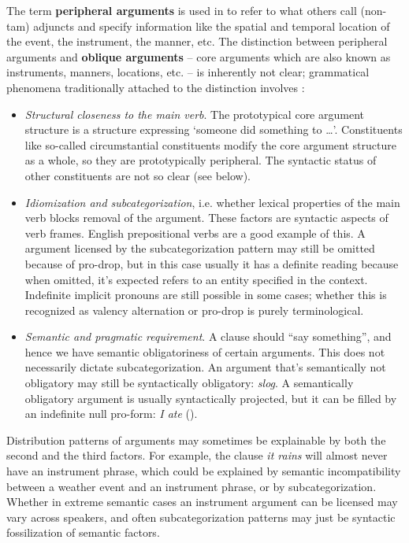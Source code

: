\documentclass[a4paper, oneside, 12pt]{report}
\newcommand*{\concept}[1]{\textbf{#1}}
\newcommand{\form}[1]{\emph{#1}}
\newcommand{\translate}[1]{`#1'}
\begin{document}
The term \concept{peripheral arguments} is used in \citet{dixon2009basic1}
to refer to what others call (non-\ac{tam}) adjuncts
and specify information like the spatial and temporal location of the event,
the instrument, the manner, etc.
The distinction between peripheral arguments and
\concept{oblique arguments} -- core arguments which are also known as instruments, manners, locations, etc. --
is inherently not clear;
grammatical phenomena traditionally attached to the distinction involves 
\citep{mcinnerney2022argument}:
\begin{itemize}
    \item \emph{Structural closeness to the main verb}.
    The prototypical core argument structure is a structure expressing 
    \translate{someone did something to \dots}.
    Constituents like so-called circumstantial constituents modify the core argument structure as a whole,
    so they are prototypically peripheral. 
    The syntactic status of other constituents are not so clear (see below).

    \item \emph{Idiomization and subcategorization},
    i.e. whether lexical properties of the main verb blocks removal of the argument.
    These factors are syntactic aspects of verb frames.
    English prepositional verbs are a good example of this.
    A argument licensed by the subcategorization pattern may still be omitted
    because of pro-drop,
    but in this case usually it has a definite reading
    because when omitted, it's expected refers to an entity specified in the context.
    Indefinite implicit pronouns are still possible in some cases;
    whether this is recognized as valency alternation or pro-drop
    is purely terminological.

    \item \emph{Semantic and pragmatic requirement}.
    A clause should ``say something'', and hence we have semantic obligatoriness of certain arguments.
    This does not necessarily dictate subcategorization.
    An argument that's semantically not obligatory may still be syntactically obligatory: \form{slog}.
    A semantically obligatory argument is usually syntactically projected,
    but it can be filled by an indefinite null pro-form:
    \form{I ate} ().
\end{itemize}
Distribution patterns of arguments may sometimes be explainable
by both the second and the third factors. 
For example, the clause \form{it rains} will almost never have an instrument phrase,
which could be explained by semantic incompatibility between
a weather event and an instrument phrase,
or by subcategorization. 
Whether in extreme semantic cases an instrument argument can be licensed
may vary across speakers,
and often subcategorization patterns may just be syntactic fossilization of semantic factors. 
\end{document}
